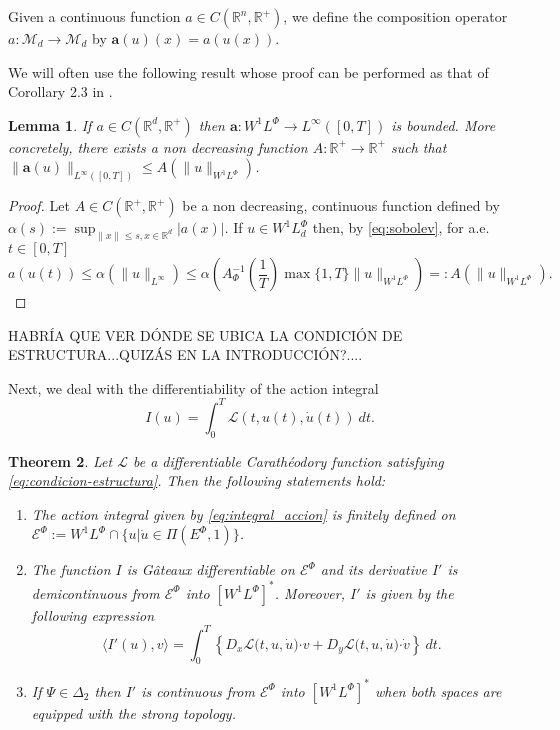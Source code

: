 \documentclass[twoside]{article}
\newtheorem{thm}{Theorem}[section]
\newtheorem{lem}[thm]{Lemma}
\theoremstyle{remark}
\newcommand{\lphi}{L^{\Phi}}
\newcommand{\ephi}{E^{\Phi}}
\newcommand{\wphi}{W^{1}\lphi}
\newcommand{\sobnor}{\|_{W^{1}\lphi}}
\newcommand{\domi}{\mathcal{E}^{\Phi}}
\renewcommand{\b}[1]{\boldsymbol{#1}}
\newcommand{\rr}{\mathbb{R}}
\newcommand{\ccdot}{\b{\cdot}}
\renewcommand{\leq}{\leqslant}
\begin{document}
Given a continuous function $a\in C(\mathbb{R}^n,\mathbb{R}^+)$, we define the composition operator $a:\mathcal{M}_d\to \mathcal{M}_d$ by $\b{a}(u)(x)= a(u(x))$.

We will often use the following result whose proof can be performed as that of  Corollary 2.3 in \cite{ABGMS2015}. 
\begin{lem}\label{lem:cota-a}
\label{a_bound} If $a\in C(\mathbb{R}^d,\mathbb{R}^+)$ then $\b{a}:\wphi\to L^{\infty}([0,T])$ is bounded. 
More concretely,  there exists a non decreasing function $A:\mathbb{R}^+\to\mathbb{R}^+$ such that
 $\|\b{a}(u)\|_{L^{\infty}([0,T])}\leq A(\|u\|_{\wphi})$.
\end{lem}


\begin{proof}  Let $A \in C(\mathbb{R}^+,\mathbb{R}^+)$ be a  non decreasing, continuous function defined by  
$\alpha(s):=\sup_{\|x\|\leq s, x \in \rr^d}|a(x)|$.  If $u \in \wphi_d$ then, by  \ref{eq:sobolev}, for a.e. $t\in [0,T]$
\[a(u(t))\leq \alpha (\|u\|_{L^{\infty}})\leq 
\alpha \left(
A_\Phi^{-1}\left(\frac{1}{T}\right)\max\{1,T\}\|u\sobnor\right)=: 
A(\|u\sobnor).\]
\end{proof}



HABR\'IA QUE VER D\'ONDE SE UBICA LA CONDICI\'ON DE ESTRUCTURA...QUIZ\'AS EN LA INTRODUCCI\'ON?....


Next, we deal with the differentiability of the action integral 
\begin{equation}\label{eq:integral_accion}
I(u)=\int_{0}^T \mathcal{L}(t,u(t),\dot{u}(t))\ dt.
\end{equation}

\begin{thm}\label{teo:diferenciabilidad}
Let $\mathcal{L}$ be a differentiable Carath\'eodory function satisfying \eqref{eq:condicion-estructura}.
Then the following statements hold:
\begin{enumerate}
\item \label{it:T1item1} \label{A1} The action integral given by \eqref{eq:integral_accion}
is finitely defined on $\domi:=W^{1}\lphi\cap\{u|\dot{u}\in\Pi(\ephi,1)\}$.

\item\label{it:T1item3} The function  $I$ is G\^ateaux differentiable on $\domi$ and  its derivative $I'$ is demicontinuous from 
$\domi$  into $\left[\wphi \right]^*$. Moreover, $I'$ is given by the following expression
\begin{equation}\label{eq:DerAccion}
\langle  I'(u),v\rangle= \int_0^T \left\{D_{x}\mathcal{L}\big(t,u,\dot{u}\big)\ccdot v
+ D_{y}\mathcal{L}\big(t,u,\dot{u}\big)\ccdot\dot{v}\right\} \ dt.
\end{equation}

\item\label{it:T1item4}  If  $\Psi \in \Delta_2$ then 
  $I'$ is continuous from $\domi$ into $\left[\wphi\right]^*$ when both spaces are equipped with the strong topology.
\end{enumerate}
\end{thm}
\end{document}
